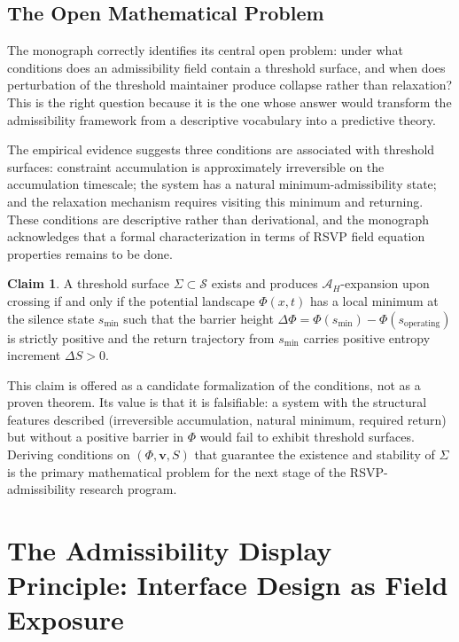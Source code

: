 \documentclass[12pt, a4paper]{article}
\theoremstyle{definition}
\newtheorem{claim}{Claim}[section]
\begin{document}
\subsection{The Open Mathematical Problem}

The monograph correctly identifies its central open problem: under what conditions does an admissibility field contain a threshold surface, and when does perturbation of the threshold maintainer produce collapse rather than relaxation? This is the right question because it is the one whose answer would transform the admissibility framework from a descriptive vocabulary into a predictive theory.

The empirical evidence suggests three conditions are associated with threshold surfaces: constraint accumulation is approximately irreversible on the accumulation timescale; the system has a natural minimum-admissibility state; and the relaxation mechanism requires visiting this minimum and returning. These conditions are descriptive rather than derivational, and the monograph acknowledges that a formal characterization in terms of RSVP field equation properties remains to be done.

\begin{claim}
A threshold surface $\Sigma \subset \mathcal{S}$ exists and produces $\mathcal{A}_H$-expansion upon crossing if and only if the potential landscape $\Phi(x,t)$ has a local minimum at the silence state $s_{\min}$ such that the barrier height $\Delta\Phi = \Phi(s_{\min}) - \Phi(s_{\mathrm{operating}})$ is strictly positive and the return trajectory from $s_{\min}$ carries positive entropy increment $\Delta S > 0$.
\end{claim}

This claim is offered as a candidate formalization of the conditions, not as a proven theorem. Its value is that it is falsifiable: a system with the structural features described (irreversible accumulation, natural minimum, required return) but without a positive barrier in $\Phi$ would fail to exhibit threshold surfaces. Deriving conditions on $(\Phi, \mathbf{v}, S)$ that guarantee the existence and stability of $\Sigma$ is the primary mathematical problem for the next stage of the RSVP-admissibility research program.

\section{The Admissibility Display Principle: Interface Design as Field Exposure}
\end{document}
